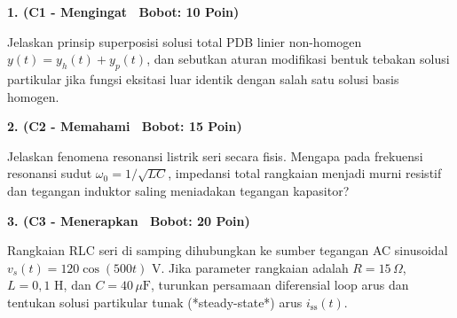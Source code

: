 \documentclass[10pt,a4paper]{article}
\begin{document}
\par
\vspace{1mm}

\noindent\textbf{1. (C1 - Mengingat \textbar\ Bobot: 10 Poin)}\par\vspace{0.8mm}
{\footnotesize Jelaskan prinsip superposisi solusi total PDB linier non-homogen $y(t) = y_h(t) + y_p(t)$, dan sebutkan aturan modifikasi bentuk tebakan solusi partikular jika fungsi eksitasi luar identik dengan salah satu solusi basis homogen.}\par

\vspace{2.5mm}

\noindent\textbf{2. (C2 - Memahami \textbar\ Bobot: 15 Poin)}\par\vspace{0.8mm}
{\footnotesize Jelaskan fenomena resonansi listrik seri secara fisis. Mengapa pada frekuensi resonansi sudut $\omega_0 = 1/\sqrt{LC}$, impedansi total rangkaian menjadi murni resistif dan tegangan induktor saling meniadakan tegangan kapasitor?}\par

\vspace{2.5mm}

\noindent\textbf{3. (C3 - Menerapkan \textbar\ Bobot: 20 Poin)}\par\vspace{0.8mm}
\noindent\begin{minipage}[t]{0.60\textwidth}%
  {\footnotesize Rangkaian RLC seri di samping dihubungkan ke sumber tegangan AC sinusoidal $v_s(t) = 120 \cos(500 t)\text{ V}$. Jika parameter rangkaian adalah $R = 15\,\Omega$, $L = 0{,}1\text{ H}$, dan $C = 40\,\mu\text{F}$, turunkan persamaan diferensial loop arus dan tentukan solusi partikular tunak (*steady-state*) arus $i_{\text{ss}}(t)$.}%
\end{minipage}%
\hfill%
\begin{minipage}[t]{0.37\textwidth}%
  \centering
\end{minipage}\par
\end{document}
